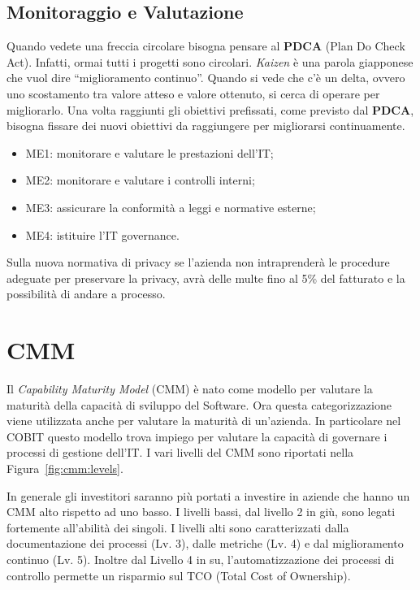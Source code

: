 \subsection{Monitoraggio e Valutazione}
Quando vedete una freccia circolare bisogna pensare al \textbf{PDCA} (Plan Do
Check Act). Infatti, ormai tutti i progetti sono circolari. \emph{Kaizen} è
una parola giapponese che vuol dire “miglioramento continuo”. Quando si vede
che c’è un delta, ovvero uno scostamento tra valore atteso e valore ottenuto,
si cerca di operare per migliorarlo. Una volta raggiunti gli obiettivi
prefissati, come previsto dal \textbf{PDCA}, bisogna fissare dei nuovi
obiettivi da raggiungere per migliorarsi continuamente.

\begin{itemize}
\item ME1: monitorare e valutare le prestazioni dell'IT;
\item ME2: monitorare e valutare i controlli interni;
\item ME3: assicurare la conformità a leggi e normative esterne;
\item ME4: istituire l'IT governance.
\end{itemize}

Sulla nuova normativa di privacy se l'azienda non intraprenderà le procedure
adeguate per preservare la privacy, avrà delle multe fino al 5\% del fatturato
e la possibilità di andare a processo.






\section{CMM}

Il \textit{Capability Maturity Model} (CMM) è nato come modello per
valutare la maturità della capacità
di sviluppo del Software. Ora questa categorizzazione viene utilizzata
anche per valutare la maturità di un'azienda.
In particolare nel COBIT questo modello trova impiego per valutare la
capacità di governare i processi di gestione dell'IT.
I vari livelli del CMM sono riportati nella Figura~\ref{fig:cmm:levels}.

In generale gli investitori saranno più portati a investire in aziende che
hanno un CMM alto rispetto ad uno basso.
I livelli bassi, dal livello 2 in giù, sono legati fortemente all'abilità
dei singoli.
I livelli alti sono caratterizzati
dalla documentazione dei processi (Lv. 3),
dalle metriche (Lv. 4) e dal miglioramento continuo (Lv. 5).
Inoltre dal Livello 4 in su,
l'automatizzazione dei processi di controllo permette un risparmio sul
TCO (Total Cost of Ownership).

